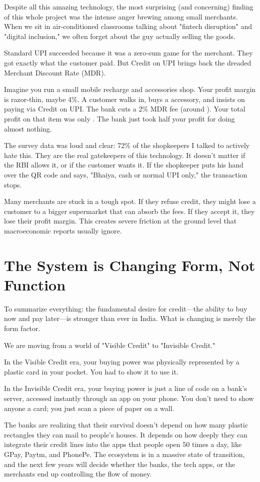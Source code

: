 Despite all this amazing technology, the most surprising (and concerning) finding of this whole project was the intense anger brewing among small merchants. When we sit in air-conditioned classrooms talking about "fintech disruption" and "digital inclusion," we often forget about the guy actually selling the goods.

Standard UPI succeeded because it was a zero-sum game for the merchant. They got exactly what the customer paid. But Credit on UPI brings back the dreaded Merchant Discount Rate (MDR).

Imagine you run a small mobile recharge and accessories shop. Your profit margin is razor-thin, maybe 4\%. A customer walks in, buys a  accessory, and insists on paying via Credit on UPI. The bank cuts a 2\% MDR fee (around ). Your total profit on that item was only . The bank just took half your profit for doing almost nothing.

The survey data was loud and clear: 72\% of the shopkeepers I talked to actively hate this. They are the real gatekeepers of this technology. It doesn't matter if the RBI allows it, or if the customer wants it. If the shopkeeper puts his hand over the QR code and says, "Bhaiya, cash or normal UPI only," the transaction stops.

Many merchants are stuck in a tough spot. If they refuse credit, they might lose a customer to a bigger supermarket that can absorb the fees. If they accept it, they lose their profit margin. This creates severe friction at the ground level that macroeconomic reports usually ignore.

\section{The System is Changing Form, Not Function}

To summarize everything: the fundamental desire for credit---the ability to buy now and pay later---is stronger than ever in India. What is changing is merely the form factor.

We are moving from a world of "Visible Credit" to "Invisible Credit."

In the Visible Credit era, your buying power was physically represented by a plastic card in your pocket. You had to show it to use it.

In the Invisible Credit era, your buying power is just a line of code on a bank's server, accessed instantly through an app on your phone. You don't need to show anyone a card; you just scan a piece of paper on a wall.

The banks are realizing that their survival doesn't depend on how many plastic rectangles they can mail to people's houses. It depends on how deeply they can integrate their credit lines into the apps that people open 50 times a day, like GPay, Paytm, and PhonePe. The ecosystem is in a massive state of transition, and the next few years will decide whether the banks, the tech apps, or the merchants end up controlling the flow of money.